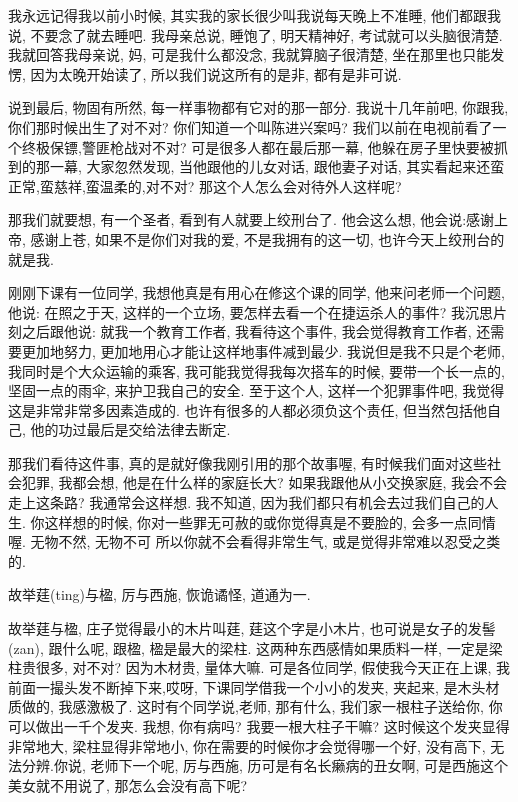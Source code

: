\documentclass[11pt]{article}
\begin{document}
我永远记得我以前小时候, 其实我的家长很少叫我说每天晚上不准睡, 他们都跟我说, 不要念了就去睡吧. 我母亲总说, 睡饱了, 明天精神好, 考试就可以头脑很清楚. 我就回答我母亲说, 妈, 可是我什么都没念, 我就算脑子很清楚, 坐在那里也只能发愣, 因为太晚开始读了, 所以我们说这所有的是非, 都有是非可说.


说到最后, {\color{blue} 物固有所然}, 每一样事物都有它对的那一部分. 我说十几年前吧, 你跟我, 你们那时候出生了对不对? 你们知道一个叫陈进兴案吗? 我们以前在电视前看了一个终极保镖,警匪枪战对不对?
可是很多人都在最后那一幕, 他躲在房子里快要被抓到的那一幕, 大家忽然发现, 当他跟他的儿女对话, 跟他妻子对话, 其实看起来还蛮正常,蛮慈祥,蛮温柔的,对不对? 那这个人怎么会对待外人这样呢?

那我们就要想, 有一个圣者, 看到有人就要上绞刑台了. 他会这么想, 他会说:感谢上帝, 感谢上苍, 如果不是你们对我的爱, 不是我拥有的这一切, 也许今天上绞刑台的就是我.

刚刚下课有一位同学, 我想他真是有用心在修这个课的同学, 他来问老师一个问题, 他说: 在照之于天, 这样的一个立场, 要怎样去看一个在捷运杀人的事件? 我沉思片刻之后跟他说: 就我一个教育工作者, 我看待这个事件, 我会觉得教育工作者, 还需要更加地努力, 更加地用心才能让这样地事件减到最少. 我说但是我不只是个老师, 我同时是个大众运输的乘客, 我可能我觉得我每次搭车的时候, 要带一个长一点的, 坚固一点的雨伞, 来护卫我自己的安全. 至于这个人, 这样一个犯罪事件吧, 我觉得这是非常非常多因素造成的. 也许有很多的人都必须负这个责任, 但当然包括他自己, 他的功过最后是交给法律去断定. 

那我们看待这件事, 真的是就好像我刚引用的那个故事喔, 有时候我们面对这些社会犯罪, 我都会想, 他是在什么样的家庭长大? 如果我跟他从小交换家庭, 我会不会走上这条路? 我通常会这样想. 我不知道, 因为我们都只有机会去过我们自己的人生. 你这样想的时候, 你对一些罪无可赦的或你觉得真是不要脸的, 会多一点同情喔. {\color{blue} 无物不然, 无物不可} 所以你就不会看得非常生气, 或是觉得非常难以忍受之类的.

\begin{center}
	{\color{green} 故举莛(ting)与楹, 厉与西施, 恢诡谲怪, 道通为一. }
\end{center}

\vspace{-0.5cm}

{\color{blue} 故举莛与楹,} 庄子觉得最小的木片叫莛, 莛这个字是小木片, 也可说是女子的发髻(zan), 跟什么呢, 跟楹, 楹是最大的梁柱. 这两种东西感情如果质料一样, 一定是梁柱贵很多, 对不对? 因为木材贵, 量体大嘛. 可是各位同学, 假使我今天正在上课, 我前面一撮头发不断掉下来,哎呀, 下课同学借我一个小小的发夹, 夹起来, 是木头材质做的, 我感激极了. 这时有个同学说,老师, 那有什么, 我们家一根柱子送给你, 你可以做出一千个发夹. 我想, 你有病吗? 我要一根大柱子干嘛? 这时候这个发夹显得非常地大, 梁柱显得非常地小, 你在需要的时候你才会觉得哪一个好, 没有高下, 无法分辨.你说, 老师下一个呢, {\color{blue} 厉与西施}, 历可是有名长癞病的丑女啊, 可是西施这个美女就不用说了, 那怎么会没有高下呢? 
\end{document}
